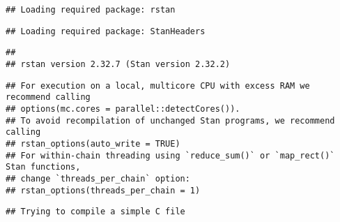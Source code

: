 \documentclass[
]{article}
\begin{document}
\begin{verbatim}
## Loading required package: rstan
\end{verbatim}

\begin{verbatim}
## Loading required package: StanHeaders
\end{verbatim}

\begin{verbatim}
## 
## rstan version 2.32.7 (Stan version 2.32.2)
\end{verbatim}

\begin{verbatim}
## For execution on a local, multicore CPU with excess RAM we recommend calling
## options(mc.cores = parallel::detectCores()).
## To avoid recompilation of unchanged Stan programs, we recommend calling
## rstan_options(auto_write = TRUE)
## For within-chain threading using `reduce_sum()` or `map_rect()` Stan functions,
## change `threads_per_chain` option:
## rstan_options(threads_per_chain = 1)
\end{verbatim}

\begin{verbatim}
## Trying to compile a simple C file
\end{verbatim}
\end{document}
